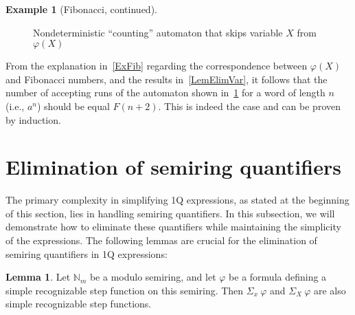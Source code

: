 \documentclass[en]{pracamgr}
\theoremstyle{definition}
\newtheorem{lemma}[theorem]{Lemma}
\newtheorem{example}{Example}[section]
\begin{document}
\begin{example}[Fibonacci, continued]
    \begin{figure}[ht]
        \centering
        \caption{Nondeterministic ``counting'' automaton that skips variable $X$ from $\varphi(X)$}
        \label{fig:my_label2}
    \end{figure}

    From the explanation in~\cref{ExFib} regarding the correspondence between $\varphi(X)$ and Fibonacci numbers, and the results in~\cref{LemElimVar}, it follows that the number of accepting runs of the automaton shown in~\cref{fig:my_label2} for a word of length $n$ (i.e., $a^n$) should be equal $F(n+2)$. This is indeed the case and can be proven by induction.
\end{example}

\section{Elimination of semiring quantifiers}
The primary complexity in simplifying 1Q expressions, as stated at the beginning of this section, lies in handling semiring quantifiers. In this subsection, we will demonstrate how to eliminate these quantifiers while maintaining the simplicity of the expressions. The following lemmas are crucial for the elimination of semiring quantifiers in 1Q expressions:

\begin{lemma}
    \label{QuantElimAdd}
    Let $\mathbb{N}_m$ be a modulo semiring, and let $\varphi$ be a formula defining a simple recognizable step function on this semiring. Then $\Sigma_x \ \varphi$ and $\Sigma_X \ \varphi$ are also simple recognizable step functions.
\end{lemma}
\end{document}
